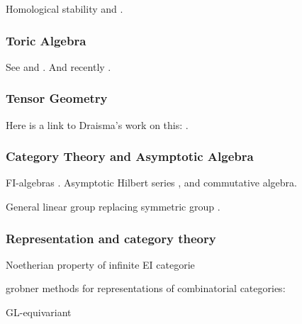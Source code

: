 Homological stability \cite{randal2013homological} and \cite{church2012homological}.


\subsubsection{Toric Algebra}



See \cite{Hillar13, hillar2016corrigendum} and \cite{draisma2013noetherianity}.  And recently \cite{KKL:equivariant-markov}.

\subsubsection{Tensor Geometry}

Here is a link to Draisma's work on this:  \cite{draisma2014bounded}.

\subsubsection{Category Theory and Asymptotic Algebra}

FI-algebras \cite{church2014fi, church2015fi}.  Asymptotic Hilbert series \cite{Nagel}, \cite{krone2016hilbert} and commutative algebra. 

General linear group replacing symmetric group \cite{}.

\subsubsection{Representation and category theory}

Noetherian property of infinite EI categorie \cite{gan2015noetherian}

\cite{putman2014representation}

grobner methods for representations of combinatorial categories: \cite{sam2016grobner}

GL-equivariant \cite{sam2016gl}


